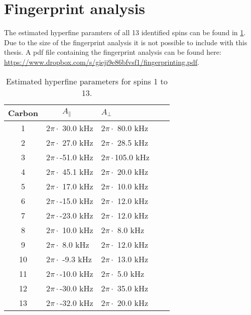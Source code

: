 \section{Fingerprint analysis}
\label{chap:Fingerprint_data_appendix}
The estimated hyperfine paramters of all 13 identified spins can be found in \cref{tbl:HF_par_appendix}. Due to the size of the fingerprint analysis it is not possible to include with this thesis. A pdf file containing the fingerprint analysis can be found here: \url{https://www.dropbox.com/s/gieji9e86bfvsf1/fingerprinting.pdf}.

\begin{table}[htbp]
    \centering
    \caption{Estimated hyperfine parameters for spins 1 to 13.}
    \begin{tabular}{cllll}
    Carbon &  $\quad \quad A_{\parallel} $ &\quad \quad  $A_{\perp}$ \\ \hline
    1 & 2$\pi \cdot ${ }30.0 kHz & 2$\pi \cdot ${ }80.0 kHz \\
    2 & 2$\pi \cdot ${ }27.0 kHz & 2$\pi \cdot ${ }28.5 kHz \\
    3 & 2$\pi \cdot $-51.0 kHz & 2$\pi \cdot $105.0 kHz \\
    4 & 2$\pi \cdot ${ }45.1 kHz & 2$\pi \cdot ${ }20.0 kHz \\
    5 & 2$\pi \cdot ${ }17.0 kHz & 2$\pi \cdot ${ }10.0 kHz \\
    6 & 2$\pi \cdot $-15.0 kHz & 2$\pi \cdot ${ }12.0 kHz \\
    7 & 2$\pi \cdot $-23.0 kHz & 2$\pi \cdot ${ }12.0 kHz \\
    8 & 2$\pi \cdot ${ }10.0 kHz & 2$\pi \cdot ${ }{ }8.0 kHz \\
    9 & 2$\pi \cdot ${ }{ }8.0 kHz & 2$\pi \cdot ${ }12.0 kHz \\
    10 & 2$\pi \cdot ${ }-9.3 kHz & 2$\pi \cdot ${ }13.0 kHz \\
    11 & 2$\pi \cdot $-10.0 kHz & 2$\pi \cdot ${ }{ }5.0 kHz \\
    12 & 2$\pi \cdot $-30.0 kHz & 2$\pi \cdot ${ }35.0 kHz \\
    13 & 2$\pi \cdot $-32.0 kHz & 2$\pi \cdot ${ }20.0 kHz \\
    \end{tabular}
    \label{tbl:HF_par_appendix}
\end{table}
